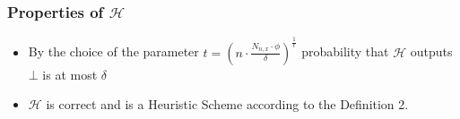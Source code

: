 \begin{frame}
    \frametitle{Properties of $\mathcal{H}$}

    \begin{itemize}
        \item By the choice of the parameter $t = (n \cdot \frac{N_{n, x} \cdot \phi}{\delta}) ^{\frac{1}{\epsilon}}$ probability that $\mathcal{H}$ outputs $\bot$ is at most $\delta$
        \item $\mathcal{H}$ is correct and is a Heuristic Scheme according to the Definition 2.
    \end{itemize}

\end{frame}

